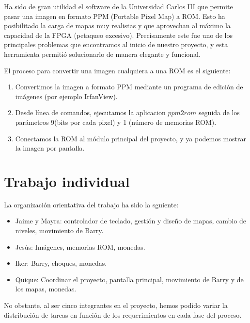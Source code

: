 \documentclass[11pt, a4paper, spanish, openright, twoside]{book}
\begin{document}
Ha sido de gran utilidad el software de la Universidad Carlos III que permite pasar una imagen en formato PPM (Portable Pixel Map) a ROM. Esto ha posibilitado la carga de mapas muy realistas y que aprovechan al máximo la capacidad de la FPGA (petaqueo excesivo).
Precisamente este fue uno de los principales problemas que encontramos al inicio de nuestro proyecto, y esta herramienta permitió solucionarlo de manera elegante y funcional. 

El proceso para convertir una imagen cualquiera a una ROM es el siguiente:
\begin{enumerate}
\item Convertimos la imagen a formato PPM mediante un programa de edición de imágenes (por ejemplo IrfanView).
\item Desde línea de comandos, ejecutamos la aplicacion $ppm2rom$ seguida de los parámetros 9(bits por cada pixel) y 1 (número de memorias ROM).
\item Conectamos la ROM al módulo principal del proyecto, y ya podemos mostrar la imagen por pantalla.
\end{enumerate}

\section{Trabajo individual}
La organización orientativa del trabajo ha sido la sguiente:
\begin{itemize}
\item Jaime y Mayra: controlador de teclado, gestión y diseño de mapas, cambio de niveles, movimiento de Barry.
\item Jesús: Imágenes, memorias ROM, monedas.
\item Iker: Barry, choques, monedas.
\item Quique: Coordinar el proyecto, pantalla principal, movimiento de Barry y de los mapas, monedas.
\end{itemize}
No obstante, al ser cinco integrantes en el proyecto, hemos podido variar la distribución de tareas en función de los requerimientos en cada fase del proceso. 
\end{document}

